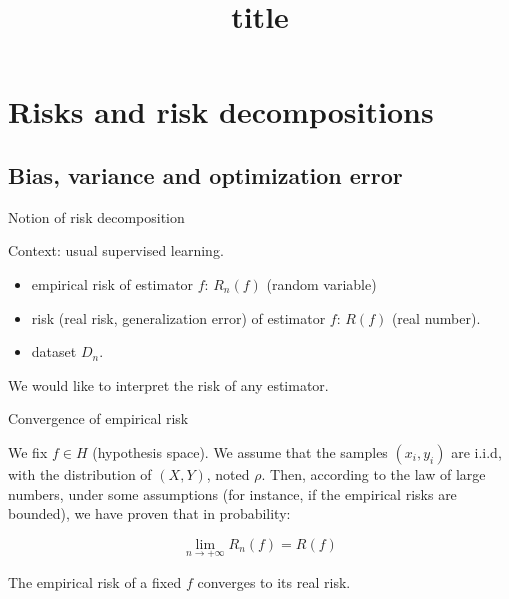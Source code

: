 \documentclass[usenames,dvipsnames]{beamer}
\title[FTML]{title}
\date{} %
\begin{document}
\begin{frame}
\titlepage %
\end{frame}

\begin{frame}
\tableofcontents %
\end{frame}

\section{Risks and risk decompositions}

\subsection{Bias, variance and optimization error}

\begin{frame}{Notion of risk decomposition}

    Context: usual supervised learning.
    \begin{itemize}
	\item empirical risk of estimator $f$: $R_n(f)$ (random variable)
	\item risk (real risk, generalization error) of estimator $f$: $R(f)$ (real number).
	    \item dataset $D_n$.
    \end{itemize}
    
We would like to interpret the risk of any estimator.

\end{frame}

\begin{frame}{Convergence of empirical risk}

    We fix $f\in H$ (hypothesis space).  We assume that the samples $(x_i,
    y_i)$ are i.i.d, with the distribution of $(X,Y)$, noted $\rho$. Then, according to the law of large numbers,
    under some assumptions (for instance, if the empirical risks are bounded),
    we have proven that in probability:

    \begin{equation}
        \lim_{n\rightarrow+\infty} R_n(f) = R(f)
    \end{equation}

    The empirical risk of a fixed $f$ converges to its real risk.
    
\end{frame}
\end{document}
